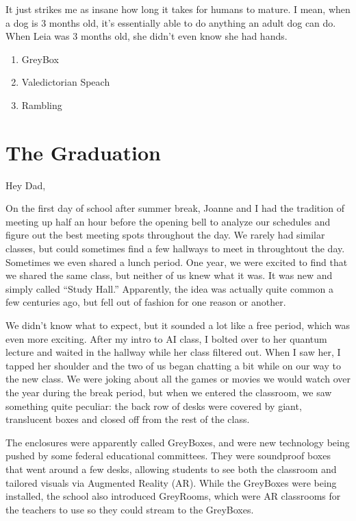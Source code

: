 It just strikes me as insane how long it takes for humans to mature.
I mean, when a dog is 3 months old, it's essentially able to do anything an adult dog can do.
When Leia was 3 months old, she didn't even know she had hands.

\begin{enumerate}
\item GreyBox
\item Valedictorian Speach
\item Rambling
\end{enumerate}

\chapter{The Graduation}

\noindent Hey Dad,

On the first day of school after summer break, Joanne and I had the tradition of meeting up half an hour before the opening bell to analyze our schedules and figure out the best meeting spots throughout the day.
We rarely had similar classes, but could sometimes find a few hallways to meet in throughtout the day.
Sometimes we even shared a lunch period.
One year, we were excited to find that we shared the same class, but neither of us knew what it was.
It was new and simply called ``Study Hall.''
Apparently, the idea was actually quite common a few centuries ago, but fell out of fashion for one reason or another.

We didn't know what to expect, but it sounded a lot like a free period, which was even more exciting.
After my intro to AI class, I bolted over to her quantum lecture and waited in the hallway while her class filtered out.
When I saw her, I tapped her shoulder and the two of us began chatting a bit while on our way to the new class.
We were joking about all the games or movies we would watch over the year during the break period, but when we entered the classroom, we saw something quite peculiar: the back row of desks were covered by giant, translucent boxes and closed off from the rest of the class.

The enclosures were apparently called GreyBoxes, and were new technology being pushed by some federal educational committees.
They were soundproof boxes that went around a few desks, allowing students to see both the classroom and tailored visuals via Augmented Reality (AR).
While the GreyBoxes were being installed, the school also introduced GreyRooms, which were AR classrooms for the teachers to use so they could stream to the GreyBoxes.

